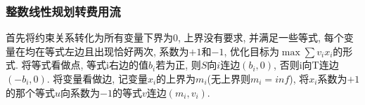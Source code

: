 \subsubsection{整数线性规划转费用流}
\noindent
首先将约束关系转化为所有变量下界为$0$, 上界没有要求, 并满足一些等式,
每个变量在均在等式左边且出现恰好两次, 系数为$+1$和$-1$, 优化目标为$\max\sum v_ix_i$的形式.
将等式看做点, 等式i右边的值$b_i$若为正, 则$S$向$i$连边$(b_i, 0)$, 否则i向T连边$(-b_i, 0)$.
将变量看做边, 记变量$x_i$的上界为$m_i$(无上界则$m_i=inf$), 将$x_i$系数为$+1$的那个等式$u$向系数为$-1$的等式$v$连边$(m_i, v_i)$.
